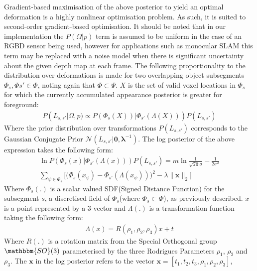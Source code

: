 Gradient-based maximisation of the above posterior to yield an optimal deformation is a highly nonlinear optimisation problem. As such, it is suited 
to second-order gradient-based optimisation.
It should be noted that in our implementation the $P(\Omega | p)$ term is assumed to be uniform in the case of an 
RGBD sensor being used, however for applications such as monocular SLAM this term may be replaced with a noise model when there is 
significant uncertainty about the given depth map at each frame.
The following proportionality to the distribution over deformations is made for two overlapping object subsegments $\Phi_{s}, \Phi{s'} \in \Phi$, noting again that 
$\Phi \subset \Psi$. $X$ is the set of valid voxel locations in $\Phi_{s}$ for which the currently accumulated appearance posterior is greater for foreground:
\begin{equation}
\begin{split}
P(L_{s, s'} | \Omega, p) \propto P(\Phi_{s}(X)) | \Phi_{s'}(\Lambda(X)))P(L_{s, s'})
\end{split}
\end{equation}
Where the prior distribution over transformations $P(L_{s, s'})$ corresponds to the Gaussian Conjugate Prior $\mathcal{N}(L_{s, s'} | \mathbf{0}, \mathbf{\lambda}^{-1})$.
The log posterior of the above expression takes the following form:
\begin{equation}
\begin{split}
\ln P(\Phi_{s}(x) | \Phi_{s'}(\Lambda(x)))P(L_{s, s'}) = m\ln\frac{1}{\sqrt{2\pi}\sigma} -\frac{1}{2\sigma^2} \\ 
\sum_{\psi \in \Phi_{s}} \Bigg [ \bigg( \Phi_{s}(x_{\psi}) - \Phi_{s'}(\Lambda(x_{\psi})) \bigg)^2  - \lambda \lVert \mathbf{\mathbf{x}} \rVert_{2} \Bigg ]
\end{split}
\end{equation}
Where $\Phi_{s}(.)$ is a scalar valued SDF(Signed Distance Function) for the subsegment $s$, a discretised field of $\Phi_{s}$(where $\Phi_{s} \subset \Phi$), as previously described. $x$ is a point represented by a 3-vector and $\Lambda(.)$ is a transformation function taking the following form:
\begin{equation}
\begin{split}
\Lambda(x) = R(\rho_{1}, \rho_{2}, \rho_{3})x + t
\end{split}
\end{equation}
Where $R(.)$ is a rotation matrix from the Special Orthogonal group $\mathbbm{SO}(3)$ parameterised by the three 
Rodrigues Parameters \cite{Shuster1993} $\rho_{1}$, $\rho_{2}$ and $\rho_{3}$. The $\mathbf{x}$ in the log posterior refers to the vector $\mathbf{x} = [t_{1}, t_{2}, t_{3}, \rho_{1}, \rho_{2}, \rho_{3}]$, 
